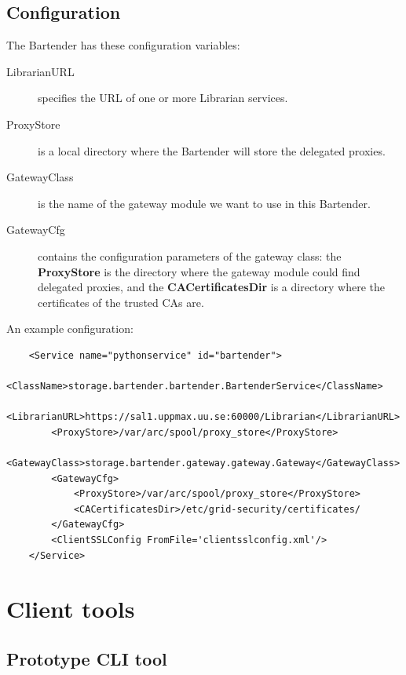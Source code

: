 \documentclass{book}
\begin{document}
\subsection{Configuration} %

The Bartender has these configuration variables:

\begin{description}
    \item[LibrarianURL] specifies the URL of one or more Librarian services.
    \item[ProxyStore] is a local directory where the Bartender will store the delegated proxies.
    \item[GatewayClass] is the name of the gateway module we want to use in this Bartender.
    \item[GatewayCfg] contains the configuration parameters of the gateway class: the \textbf{ProxyStore} is the directory where the gateway module could find delegated proxies, and the \textbf{CACertificatesDir} is a directory where the certificates of the trusted CAs are. 
\end{description}

An example configuration:

\begin{verbatim}
    <Service name="pythonservice" id="bartender">
        <ClassName>storage.bartender.bartender.BartenderService</ClassName>
        <LibrarianURL>https://sal1.uppmax.uu.se:60000/Librarian</LibrarianURL>
        <ProxyStore>/var/arc/spool/proxy_store</ProxyStore>
        <GatewayClass>storage.bartender.gateway.gateway.Gateway</GatewayClass>
        <GatewayCfg>
            <ProxyStore>/var/arc/spool/proxy_store</ProxyStore>
            <CACertificatesDir>/etc/grid-security/certificates/
        </GatewayCfg>
        <ClientSSLConfig FromFile='clientsslconfig.xml'/>
    </Service>
\end{verbatim}


\newpage

\section{Client tools} %
\label{sec:client_tools}

\subsection{Prototype CLI tool} %
\label{sub:prototype_cli_tool}
\end{document}
